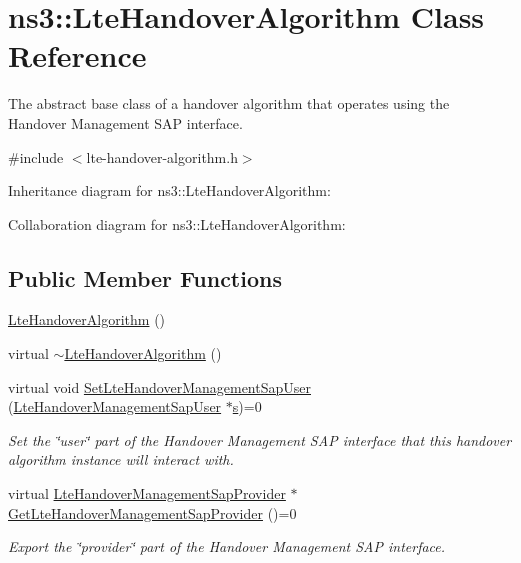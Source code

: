 \hypertarget{classns3_1_1LteHandoverAlgorithm}{}\section{ns3\+:\+:Lte\+Handover\+Algorithm Class Reference}
\label{classns3_1_1LteHandoverAlgorithm}


The abstract base class of a handover algorithm that operates using the Handover Management S\+AP interface.  




{\ttfamily \#include $<$lte-\/handover-\/algorithm.\+h$>$}



Inheritance diagram for ns3\+:\+:Lte\+Handover\+Algorithm\+:


Collaboration diagram for ns3\+:\+:Lte\+Handover\+Algorithm\+:
\subsection*{Public Member Functions}
\begin{DoxyCompactItemize}
\item 
\hyperlink{classns3_1_1LteHandoverAlgorithm_acb457c6d2a93677efd36a65376ce31fc}{Lte\+Handover\+Algorithm} ()
\item 
virtual \hyperlink{classns3_1_1LteHandoverAlgorithm_aba996bd4f48bc61aab831ee90d0eece2}{$\sim$\+Lte\+Handover\+Algorithm} ()
\item 
virtual void \hyperlink{classns3_1_1LteHandoverAlgorithm_a3e5a5f7f7f69291ea38778a21fbe8f47}{Set\+Lte\+Handover\+Management\+Sap\+User} (\hyperlink{classns3_1_1LteHandoverManagementSapUser}{Lte\+Handover\+Management\+Sap\+User} $\ast$\hyperlink{generate__test__data__lte__sinr_8m_ad83eeb3a142285d1243a08c6b7026df8}{s})=0
\begin{DoxyCompactList}\small\item\em Set the \char`\"{}user\char`\"{} part of the Handover Management S\+AP interface that this handover algorithm instance will interact with. \end{DoxyCompactList}\item 
virtual \hyperlink{classns3_1_1LteHandoverManagementSapProvider}{Lte\+Handover\+Management\+Sap\+Provider} $\ast$ \hyperlink{classns3_1_1LteHandoverAlgorithm_a271711fe4849bc28077905a21d2cadba}{Get\+Lte\+Handover\+Management\+Sap\+Provider} ()=0
\begin{DoxyCompactList}\small\item\em Export the \char`\"{}provider\char`\"{} part of the Handover Management S\+AP interface. \end{DoxyCompactList}\end{DoxyCompactItemize}
